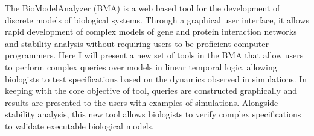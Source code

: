 The BioModelAnalyzer (BMA) is a web based tool for the development of discrete models of biological systems. Through a graphical user interface, it allows rapid development of complex models of gene and protein interaction networks and stability analysis without requiring users to be proficient computer programmers. Here I will present a new set of tools in the BMA that allow users to perform complex queries over models in linear temporal logic, allowing biologists to test specifications based on the dynamics observed in simulations. In keeping with the core objective of tool, queries are constructed graphically and results are presented to the users with examples of simulations. Alongside stability analysis, this new tool allows biologists to verify complex specifications to validate executable biological models. 